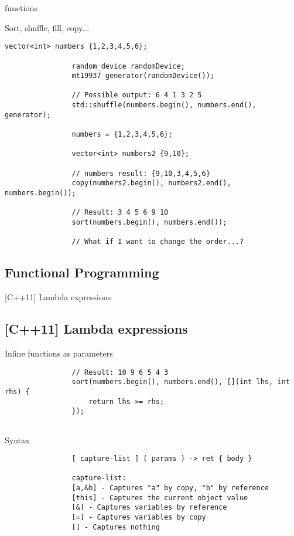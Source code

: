 \documentclass{beamer}
\newcommand{\normalSizeItem}[1] {
  \normalsize{\item #1}
}
\newcommand{\newFrameWithoutIndex}[1]{
	\begin{frame}
		#1
		\thispagestyle{empty}
	\end{frame}
}
\newcommand{\newSectionWithoutIndex}[1]{
	\newFrameWithoutIndex{\section{#1}}
}
\begin{document}
		\begin{frame}[fragile]{ functions}	
			\begin{itemize}
			
				\normalSizeItem { Sort, shuffle, fill, copy... }
				\begin{lstlisting}[basicstyle={\tiny\ttfamily}]
				vector<int> numbers {1,2,3,4,5,6};
	
				random_device randomDevice;
				mt19937 generator(randomDevice());
				
				// Possible output: 6 4 1 3 2 5 
				std::shuffle(numbers.begin(), numbers.end(), generator);
				
				numbers = {1,2,3,4,5,6};
				
				vector<int> numbers2 {9,10};
				
				// numbers result: {9,10,3,4,5,6}
				copy(numbers2.begin(), numbers2.end(), numbers.begin());
				
				// Result: 3 4 5 6 9 10
				sort(numbers.begin(), numbers.end());
				
				// What if I want to change the order...?
				\end{lstlisting}				
			\end{itemize}
		\end{frame}
		
	\newSectionWithoutIndex{Functional Programming}	
	
		\begin{frame}[fragile]{[C++11] Lambda expressions}	
			\subsection{[C++11] Lambda expressions}		
			\begin{itemize}
			
				\normalSizeItem { Inline functions as parameters }
				\begin{lstlisting}
				// Result: 10 9 6 5 4 3 
				sort(numbers.begin(), numbers.end(), [](int lhs, int rhs) { 
					return lhs >= rhs; 
				});
				
				\end{lstlisting}	
				
				\normalSizeItem { Syntax }
				\begin{lstlisting}
				[ capture-list ] ( params ) -> ret { body }
				
				capture-list:
				[a,&b] - Captures "a" by copy, "b" by reference
				[this] - Captures the current object value
				[&] - Captures variables by reference
				[=] - Captures variables by copy
				[] - Captures nothing
				\end{lstlisting}	
							
			\end{itemize}
		\end{frame}
		
\end{document}

